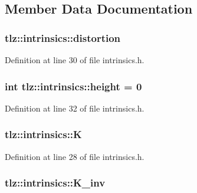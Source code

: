 \subsection{Member Data Documentation}
\subsubsection[{\texorpdfstring{distortion}{distortion}}]{ tlz\+::intrinsics\+::distortion}\hypertarget{structtlz_1_1intrinsics_ab12e43b4ce6eea463b8daabcde868ebe}{}\label{structtlz_1_1intrinsics_ab12e43b4ce6eea463b8daabcde868ebe}


Definition at line 30 of file intrinsics.\+h.

\subsubsection[{\texorpdfstring{height}{height}}]{\setlength{\rightskip}{0pt plus 5cm}int tlz\+::intrinsics\+::height = 0}\hypertarget{structtlz_1_1intrinsics_a9322081cd2b1f4c5d2b3a488ab878dfb}{}\label{structtlz_1_1intrinsics_a9322081cd2b1f4c5d2b3a488ab878dfb}


Definition at line 32 of file intrinsics.\+h.

\subsubsection[{\texorpdfstring{K}{K}}]{ tlz\+::intrinsics\+::K}\hypertarget{structtlz_1_1intrinsics_a95dbce6d7920c325e7e6b6a6ed518619}{}\label{structtlz_1_1intrinsics_a95dbce6d7920c325e7e6b6a6ed518619}


Definition at line 28 of file intrinsics.\+h.

\subsubsection[{\texorpdfstring{K\+\_\+inv}{K_inv}}]{ tlz\+::intrinsics\+::\+K\+\_\+inv}\hypertarget{structtlz_1_1intrinsics_a3f922a1395985a47a259e072ad450361}{}\label{structtlz_1_1intrinsics_a3f922a1395985a47a259e072ad450361}


